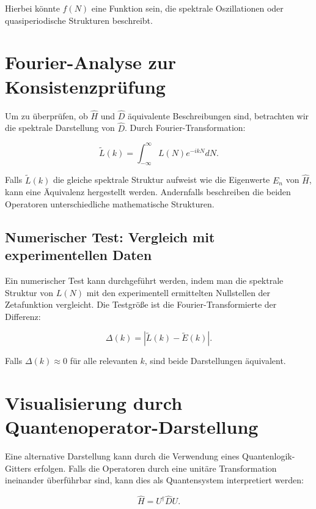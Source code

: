 \documentclass[a4paper,12pt]{article}
\begin{document}
Hierbei könnte \( f(N) \) eine Funktion sein, die spektrale Oszillationen oder quasiperiodische Strukturen beschreibt.

\section{Fourier-Analyse zur Konsistenzprüfung}
Um zu überprüfen, ob \( \hat{H} \) und \( \hat{D} \) äquivalente Beschreibungen sind, betrachten wir die spektrale Darstellung von \( \hat{D} \). Durch Fourier-Transformation:

\begin{equation}
    \tilde{L}(k) = \int_{-\infty}^{\infty} L(N) e^{-i k N} dN.
\end{equation}

Falls \( \tilde{L}(k) \) die gleiche spektrale Struktur aufweist wie die Eigenwerte \( E_n \) von \( \hat{H} \), kann eine Äquivalenz hergestellt werden. Andernfalls beschreiben die beiden Operatoren unterschiedliche mathematische Strukturen.

\subsection{Numerischer Test: Vergleich mit experimentellen Daten}
Ein numerischer Test kann durchgeführt werden, indem man die spektrale Struktur von \( L(N) \) mit den experimentell ermittelten Nullstellen der Zetafunktion vergleicht. Die Testgröße ist die Fourier-Transformierte der Differenz:

\begin{equation}
    \Delta(k) = \left| \tilde{L}(k) - \tilde{E}(k) \right|.
\end{equation}

Falls \( \Delta(k) \approx 0 \) für alle relevanten \( k \), sind beide Darstellungen äquivalent.

\section{Visualisierung durch Quantenoperator-Darstellung}
Eine alternative Darstellung kann durch die Verwendung eines Quantenlogik-Gitters erfolgen. Falls die Operatoren durch eine unitäre Transformation ineinander überführbar sind, kann dies als Quantensystem interpretiert werden:

\begin{equation}
    \hat{H} = U^\dagger \hat{D} U.
\end{equation}
\end{document}

